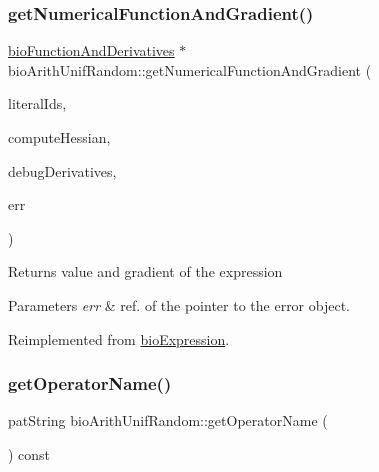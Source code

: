\mbox{\label{classbio_arith_unif_random_a0a5860c93f0efaea7f448d44f76cae60}} 
\subsubsection{\texorpdfstring{get\+Numerical\+Function\+And\+Gradient()}{getNumericalFunctionAndGradient()}}
{\footnotesize\ttfamily \hyperlink{classbio_function_and_derivatives}{bio\+Function\+And\+Derivatives} $\ast$ bio\+Arith\+Unif\+Random\+::get\+Numerical\+Function\+And\+Gradient (\begin{DoxyParamCaption}\item[{vector$<$ pat\+U\+Long $>$}]{literal\+Ids,  }\item[{pat\+Boolean}]{compute\+Hessian,  }\item[{pat\+Boolean}]{debug\+Derivatives,  }\item[{pat\+Error $\ast$\&}]{err }\end{DoxyParamCaption})\hspace{0.3cm}{\ttfamily [virtual]}}

\begin{DoxyReturn}{Returns}
value and gradient of the expression 
\end{DoxyReturn}

\begin{DoxyParams}{Parameters}
{\em err} & ref. of the pointer to the error object. \\
\hline
\end{DoxyParams}


Reimplemented from \hyperlink{classbio_expression_a91c81ce80c9e972c913b10f5f3c1ed13}{bio\+Expression}.

\mbox{\label{classbio_arith_unif_random_acd356155220e3b8cbc5d1580e1ec0f47}} 
\subsubsection{\texorpdfstring{get\+Operator\+Name()}{getOperatorName()}}
{\footnotesize\ttfamily pat\+String bio\+Arith\+Unif\+Random\+::get\+Operator\+Name (\begin{DoxyParamCaption}{ }\end{DoxyParamCaption}) const\hspace{0.3cm}{\ttfamily [virtual]}}

